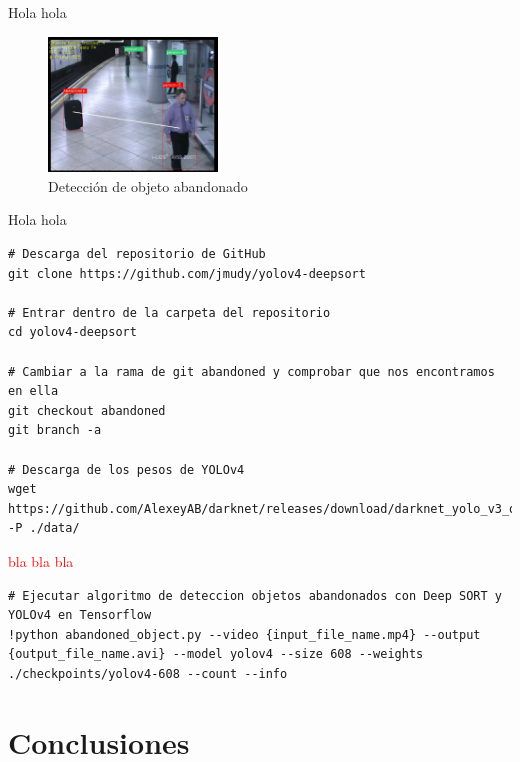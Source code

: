 Hola hola

\begin{figure}[ht]
\centering
\includegraphics[width=0.4\textwidth]{img/chapters/desarrollo/abandono-objeto-avss.jpg}
\caption{\label{fig:abandono-objeto-avss}Detección de objeto abandonado}
\end{figure}

Hola hola

\newpage

\vspace{0.5cm}
\begin{lstlisting}[language=iPython,caption=Evaluación de la detección de objetos abandonados con DeepSORT y YOLOv4 en Tensorflow (1),captionpos=b,label={lst:evaluate-abandoned-object1}]
# Descarga del repositorio de GitHub
git clone https://github.com/jmudy/yolov4-deepsort

# Entrar dentro de la carpeta del repositorio
cd yolov4-deepsort

# Cambiar a la rama de git abandoned y comprobar que nos encontramos en ella
git checkout abandoned
git branch -a

# Descarga de los pesos de YOLOv4
wget https://github.com/AlexeyAB/darknet/releases/download/darknet_yolo_v3_optimal/yolov4.weights -P ./data/
\end{lstlisting}

\textcolor{red}{bla bla bla}

\vspace{0.5cm}
\begin{lstlisting}[language=iPython,caption=Evaluación de la detección de objetos abandonados con DeepSORT y YOLOv4 en Tensorflow (2),captionpos=b,label={lst:evaluate-abandoned-object2}]
# Ejecutar algoritmo de deteccion objetos abandonados con Deep SORT y YOLOv4 en Tensorflow
!python abandoned_object.py --video {input_file_name.mp4} --output {output_file_name.avi} --model yolov4 --size 608 --weights ./checkpoints/yolov4-608 --count --info
\end{lstlisting}


\newpage

\section{Conclusiones}
\label{sec:conclu-desarrollo}

